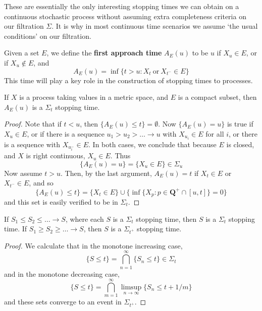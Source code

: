 These are essentially the only interesting stopping times we can obtain on a continuous stochastic process without assuming extra completeness criteria on our filtration $\Sigma$. It is why in most continuous time scenarios we assume `the usual conditions' on our filtration.

Given a set $E$, we define the {\bf first approach time} $A_E(u)$ to be $u$ if $X_u \in E$, or if $X_u \not \in E$, and
%
\[ A_E(u) = \inf \{ t > u: X_t\ \text{or}\ X_{t^-} \in E \} \]
%
This time will play a key role in the construction of stopping times to \cadlag processes.

\begin{lemma}
    If $X$ is a \cadlag process taking values in a metric space, and $E$ is a compact subset, then $A_E(u)$ is a $\Sigma_t$ stopping time.
\end{lemma}
\begin{proof}
    Note that if $t < u$, then $\{ A_E(u) \leq t \} = \emptyset$. Now $\{ A_E(u) = u \}$ is true if $X_u \in E$, or if there is a sequence $u_1 > u_2 > \dots \to u$ with $X_{u_i} \in E$ for all $i$, or there is a sequence with $X_{u_i^-} \in E$. In both cases, we conclude that because $E$ is closed, and $X$ is right continuous, $X_u \in E$. Thus
    \[ \{ A_E(u) = u \} = \{ X_u \in E \} \in \Sigma_u \]
    Now assume $t > u$. Then, by the last argument, $A_E(u) = t$ if $X_t \in E$ or $X_{t^-} \in E$, and so
    \[ \{ A_E(u) \leq t \} = \{ X_t \in E \} \cup \{ \inf \{ X_p: p \in \mathbf{Q}^+ \cap [u,t] \} = 0 \} \]
    and this set is easily verified to be in $\Sigma_t$.
\end{proof}

\begin{lemma}
    If $S_1 \leq S_2 \leq \dots \to S$, where each $S$ is a $\Sigma_t$ stopping time, then $S$ is a $\Sigma_t$ stopping time. If $S_1 \geq S_2 \geq \dots \to S$, then $S$ is a $\Sigma_{t^+}$ stopping time.
\end{lemma}
\begin{proof}
    We calculate that in the monotone increasing case,
    \[ \{ S \leq t \} = \bigcap_{n = 1}^\infty \{ S_n \leq t \} \in \Sigma_t \]
    and in the monotone decreasing case,
    \[ \{ S \leq t \} = \bigcap_{m = 1}^\infty \limsup_{n \to \infty} \{ S_n \leq t + 1/m \} \]
    and these sets converge to an event in $\Sigma_{t^+}$.
\end{proof}

